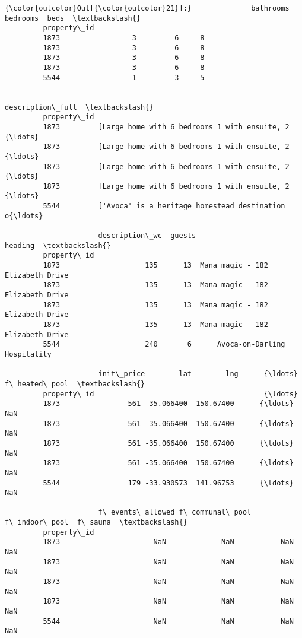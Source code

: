 \documentclass[11pt]{article}
\begin{document}
\begin{Verbatim}[commandchars=\\\{\}]
{\color{outcolor}Out[{\color{outcolor}21}]:}              bathrooms  bedrooms  beds  \textbackslash{}
         property\_id                              
         1873                 3         6     8   
         1873                 3         6     8   
         1873                 3         6     8   
         1873                 3         6     8   
         5544                 1         3     5   
         
                                                       description\_full  \textbackslash{}
         property\_id                                                      
         1873         [Large home with 6 bedrooms 1 with ensuite, 2 {\ldots}   
         1873         [Large home with 6 bedrooms 1 with ensuite, 2 {\ldots}   
         1873         [Large home with 6 bedrooms 1 with ensuite, 2 {\ldots}   
         1873         [Large home with 6 bedrooms 1 with ensuite, 2 {\ldots}   
         5544         ['Avoca' is a heritage homestead destination o{\ldots}   
         
                      description\_wc  guests                           heading  \textbackslash{}
         property\_id                                                             
         1873                    135      13  Mana magic - 182 Elizabeth Drive   
         1873                    135      13  Mana magic - 182 Elizabeth Drive   
         1873                    135      13  Mana magic - 182 Elizabeth Drive   
         1873                    135      13  Mana magic - 182 Elizabeth Drive   
         5544                    240       6      Avoca-on-Darling Hospitality   
         
                      init\_price        lat        lng      {\ldots}      f\_heated\_pool  \textbackslash{}
         property\_id                                        {\ldots}                      
         1873                561 -35.066400  150.67400      {\ldots}                NaN   
         1873                561 -35.066400  150.67400      {\ldots}                NaN   
         1873                561 -35.066400  150.67400      {\ldots}                NaN   
         1873                561 -35.066400  150.67400      {\ldots}                NaN   
         5544                179 -33.930573  141.96753      {\ldots}                NaN   
         
                      f\_events\_allowed f\_communal\_pool f\_indoor\_pool  f\_sauna  \textbackslash{}
         property\_id                                                            
         1873                      NaN             NaN           NaN      NaN   
         1873                      NaN             NaN           NaN      NaN   
         1873                      NaN             NaN           NaN      NaN   
         1873                      NaN             NaN           NaN      NaN   
         5544                      NaN             NaN           NaN      NaN   
         

\end{Verbatim}
\end{document}
